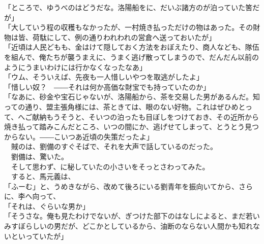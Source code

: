 \documentclass[
  paper=a5,
  fontsize=10pt,
  jafontsize=9.5pt,
  tate,                  %
  open_bracket_pos=nibu, %
]{jlreq}
\begin{document}
「ところで、ゆうべのはどうだな。洛陽船をに、だいぶ諸方のが泊っていた筈だが」\\


「大していう程の収穫もなかったが、一村焼き払っただけの物はあった。その財物は皆、荷駄にして、例の通りわれわれの営倉へ送っておいたが」\\


「近頃は人民どもも、金はけて隠しておく方法をおぼえたり、商人なども、隊伍を組んで、俺たちが襲うまえに、うまく逃げ散ってしまうので、だんだん以前のようにうまいわけには行かなくなったなあ」\\


「ウム、そういえば、先夜も一人惜しいやつを取逃がしたよ」\\


「惜しい奴？　――それは何か高価な財宝でも持っていたのか」\\


「なあに、砂金や宝石じゃないが、洛陽船から、茶を交易した男があるんだ。知っての通り、盟主張角様には、茶ときては、眼のない好物。これはぜひめとって、へご献納もうそうと、そいつの泊ったも目ぼしをつけておき、その近所から焼き払って踏みこんだところ、いつの間にか、逃げせてしまって、とうとう見つからない。――こいつあ近頃の失策だったよ」\\


　賊のは、劉備のすぐそばで、それを大声で話しているのだった。\\


　劉備は、驚いた。\\


　そして思わず、に秘していたの小さいをそっとさわってみた。\\


　すると、馬元義は、\\


「ふーむ」と、うめきながら、改めて後ろにいる劉青年を振向いてから、さらに、李へ向って、\\


「それは、ぐらいな男か」\\


「そうさな。俺も見たわけでないが、ぎつけた部下のはなしによると、まだ若いみすぼらしいの男だが、どこかとしているから、油断のならない人間かも知れないといっていたが」\\
\end{document}
